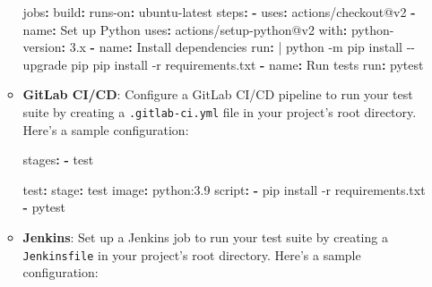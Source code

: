 \documentclass[
  paper=a4,
  ,captions=tableheading
]{scrartcl}
\newenvironment{Shaded}{}{}
\newcommand{\AttributeTok}[1]{\textcolor[rgb]{0.49,0.56,0.16}{#1}}
\newcommand{\CharTok}[1]{\textcolor[rgb]{0.25,0.44,0.63}{#1}}
\newcommand{\FunctionTok}[1]{\textcolor[rgb]{0.02,0.16,0.49}{#1}}
\newcommand{\KeywordTok}[1]{\textcolor[rgb]{0.00,0.44,0.13}{\textbf{#1}}}
\newcommand{\NormalTok}[1]{#1}
\newcommand{\StringTok}[1]{\textcolor[rgb]{0.25,0.44,0.63}{#1}}
\begin{document}
\begin{enumerate}
\begin{itemize}
\begin{Shaded}
\begin{Highlighting}[]
\FunctionTok{jobs}\KeywordTok{:}
\AttributeTok{  }\FunctionTok{build}\KeywordTok{:}
\AttributeTok{    }\FunctionTok{runs{-}on}\KeywordTok{:}\AttributeTok{ ubuntu{-}latest}
\AttributeTok{    }\FunctionTok{steps}\KeywordTok{:}
\AttributeTok{    }\KeywordTok{{-}}\AttributeTok{ }\FunctionTok{uses}\KeywordTok{:}\AttributeTok{ actions/checkout@v2}
\AttributeTok{    }\KeywordTok{{-}}\AttributeTok{ }\FunctionTok{name}\KeywordTok{:}\AttributeTok{ Set up Python}
\AttributeTok{      }\FunctionTok{uses}\KeywordTok{:}\AttributeTok{ actions/setup{-}python@v2}
\AttributeTok{      }\FunctionTok{with}\KeywordTok{:}
\AttributeTok{        }\FunctionTok{python{-}version}\KeywordTok{:}\AttributeTok{ }\StringTok{\textquotesingle{}3.x\textquotesingle{}}
\AttributeTok{    }\KeywordTok{{-}}\AttributeTok{ }\FunctionTok{name}\KeywordTok{:}\AttributeTok{ Install dependencies}
\FunctionTok{      run}\KeywordTok{: }\CharTok{|}
\NormalTok{        python {-}m pip install {-}{-}upgrade pip}
\NormalTok{        pip install {-}r requirements.txt}
\AttributeTok{    }\KeywordTok{{-}}\AttributeTok{ }\FunctionTok{name}\KeywordTok{:}\AttributeTok{ Run tests}
\AttributeTok{      }\FunctionTok{run}\KeywordTok{:}\AttributeTok{ pytest}
\end{Highlighting}
\end{Shaded}
  \item
    \textbf{GitLab CI/CD}: Configure a GitLab CI/CD pipeline to run your
    test suite by creating a \texttt{.gitlab-ci.yml} file in your
    project's root directory. Here's a sample configuration:

\begin{Shaded}
\begin{Highlighting}[]
\FunctionTok{stages}\KeywordTok{:}
\AttributeTok{  }\KeywordTok{{-}}\AttributeTok{ test}

\FunctionTok{test}\KeywordTok{:}
\AttributeTok{  }\FunctionTok{stage}\KeywordTok{:}\AttributeTok{ test}
\AttributeTok{  }\FunctionTok{image}\KeywordTok{:}\AttributeTok{ python:3.9}
\AttributeTok{  }\FunctionTok{script}\KeywordTok{:}
\AttributeTok{    }\KeywordTok{{-}}\AttributeTok{ pip install {-}r requirements.txt}
\AttributeTok{    }\KeywordTok{{-}}\AttributeTok{ pytest}
\end{Highlighting}
\end{Shaded}
  \item
    \textbf{Jenkins}: Set up a Jenkins job to run your test suite by
    creating a \texttt{Jenkinsfile} in your project's root directory.
    Here's a sample configuration:


\end{itemize}
\end{enumerate}
\end{document}
